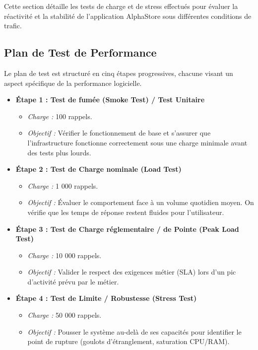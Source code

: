 \documentclass[a4paper,12pt]{article}
\begin{document}
    Cette section détaille les tests de charge et de stress effectués pour évaluer la réactivité et la stabilité de l'application AlphaStore sous différentes conditions de trafic.

    \subsection{Plan de Test de Performance}
    Le plan de test est structuré en cinq étapes progressives, chacune visant un aspect spécifique de la performance logicielle.

    \begin{itemize}[leftmargin=2em,itemsep=0.5em]
        \item \textbf{Étape 1 : Test de fumée (Smoke Test) / Test Unitaire}
        \begin{itemize}
            \item \textit{Charge :} 100 rappels.
            \item \textit{Objectif :} Vérifier le fonctionnement de base et s'assurer que l'infrastructure fonctionne correctement sous une charge minimale avant des tests plus lourds.
        \end{itemize}

        \item \textbf{Étape 2 : Test de Charge nominale (Load Test)}
        \begin{itemize}
            \item \textit{Charge :} 1 000 rappels.
            \item \textit{Objectif :} Évaluer le comportement face à un volume quotidien moyen. On vérifie que les temps de réponse restent fluides pour l'utilisateur.
        \end{itemize}

        \item \textbf{Étape 3 : Test de Charge réglementaire / de Pointe (Peak Load Test)}
        \begin{itemize}
            \item \textit{Charge :} 10 000 rappels.
            \item \textit{Objectif :} Valider le respect des exigences métier (SLA) lors d'un pic d'activité prévu par le métier.
        \end{itemize}

        \item \textbf{Étape 4 : Test de Limite / Robustesse (Stress Test)}
        \begin{itemize}
            \item \textit{Charge :} 50 000 rappels.
            \item \textit{Objectif :} Pousser le système au-delà de ses capacités pour identifier le point de rupture (goulots d'étranglement, saturation CPU/RAM).
        \end{itemize}


\end{itemize}
\end{document}
